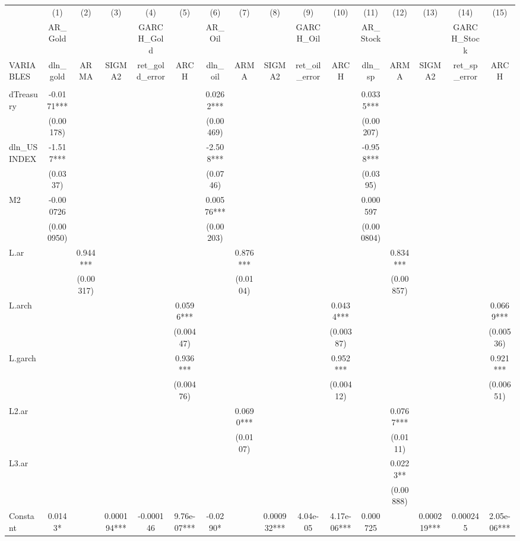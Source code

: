 \documentclass[]{article}
\begin{document}
\begin{tabular}{lccccccccccccccc} \hline
 & (1) & (2) & (3) & (4) & (5) & (6) & (7) & (8) & (9) & (10) & (11) & (12) & (13) & (14) & (15) \\
 & AR\_Gold &  &  & GARCH\_Gold &  & AR\_Oil &  &  & GARCH\_Oil &  & AR\_Stock &  &  & GARCH\_Stock &  \\
VARIABLES & dln\_gold & ARMA & SIGMA2 & ret\_gold\_error & ARCH & dln\_oil & ARMA & SIGMA2 & ret\_oil\_error & ARCH & dln\_sp & ARMA & SIGMA2 & ret\_sp\_error & ARCH \\ \hline
 &  &  &  &  &  &  &  &  &  &  &  &  &  &  &  \\
dTreasury & -0.0171*** &  &  &  &  & 0.0262*** &  &  &  &  & 0.0335*** &  &  &  &  \\
 & (0.00178) &  &  &  &  & (0.00469) &  &  &  &  & (0.00207) &  &  &  &  \\
dln\_USINDEX & -1.517*** &  &  &  &  & -2.508*** &  &  &  &  & -0.958*** &  &  &  &  \\
 & (0.0337) &  &  &  &  & (0.0746) &  &  &  &  & (0.0395) &  &  &  &  \\
M2 & -0.000726 &  &  &  &  & 0.00576*** &  &  &  &  & 0.000597 &  &  &  &  \\
 & (0.000950) &  &  &  &  & (0.00203) &  &  &  &  & (0.000804) &  &  &  &  \\
L.ar &  & 0.944*** &  &  &  &  & 0.876*** &  &  &  &  & 0.834*** &  &  &  \\
 &  & (0.00317) &  &  &  &  & (0.0104) &  &  &  &  & (0.00857) &  &  &  \\
L.arch &  &  &  &  & 0.0596*** &  &  &  &  & 0.0434*** &  &  &  &  & 0.0669*** \\
 &  &  &  &  & (0.00447) &  &  &  &  & (0.00387) &  &  &  &  & (0.00536) \\
L.garch &  &  &  &  & 0.936*** &  &  &  &  & 0.952*** &  &  &  &  & 0.921*** \\
 &  &  &  &  & (0.00476) &  &  &  &  & (0.00412) &  &  &  &  & (0.00651) \\
L2.ar &  &  &  &  &  &  & 0.0690*** &  &  &  &  & 0.0767*** &  &  &  \\
 &  &  &  &  &  &  & (0.0107) &  &  &  &  & (0.0111) &  &  &  \\
L3.ar &  &  &  &  &  &  &  &  &  &  &  & 0.0223** &  &  &  \\
 &  &  &  &  &  &  &  &  &  &  &  & (0.00888) &  &  &  \\
Constant & 0.0143* &  & 0.000194*** & -0.000146 & 9.76e-07*** & -0.0290* &  & 0.000932*** & 4.04e-05 & 4.17e-06*** & 0.000725 &  & 0.000219*** & 0.000245 & 2.05e-06*** \\

\end{tabular}
\end{document}
